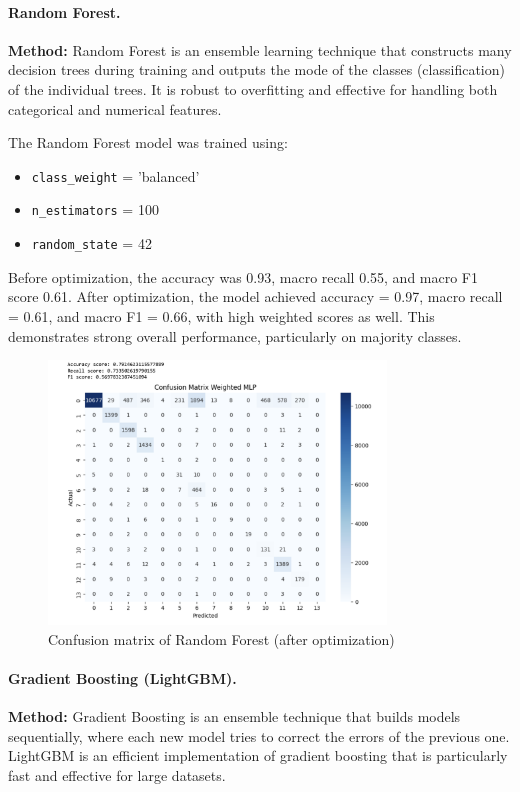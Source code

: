 \documentclass[a4paper,12pt]{article}
\begin{document}
\paragraph{Random Forest.}
\textbf{Method:} Random Forest is an ensemble learning technique that constructs many decision trees during training and outputs the mode of the classes (classification) of the individual trees. It is robust to overfitting and effective for handling both categorical and numerical features.

The Random Forest model was trained using:
\begin{itemize}
    \item \texttt{class\_weight} = 'balanced'
    \item \texttt{n\_estimators} = 100
    \item \texttt{random\_state} = 42
\end{itemize}
Before optimization, the accuracy was 0.93, macro recall 0.55, and macro F1 score 0.61. After optimization, the model achieved accuracy = 0.97, macro recall = 0.61, and macro F1 = 0.66, with high weighted scores as well. This demonstrates strong overall performance, particularly on majority classes.

\begin{figure}[H]
    \centering
    \includegraphics[width=0.8\textwidth]{Figs/Forest_search.png}
    \caption{Confusion matrix of Random Forest (after optimization)}
    \label{fig:conf_mat_rf}
\end{figure}

\paragraph{Gradient Boosting (LightGBM).}
\textbf{Method:} Gradient Boosting is an ensemble technique that builds models sequentially, where each new model tries to correct the errors of the previous one. LightGBM is an efficient implementation of gradient boosting that is particularly fast and effective for large datasets.
\end{document}
